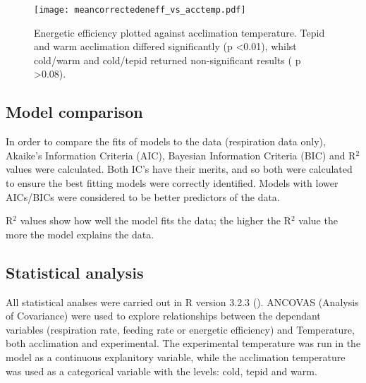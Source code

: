 \documentclass[../../Paper.tex]{subfiles}
\begin{document}
\begin{figure*}[!t]
\centering
\texttt{[image: meancorrectedeneff\_vs\_acctemp.pdf]}
\caption{Energetic efficiency plotted against acclimation temperature. Tepid and
warm acclimation differed significantly (p \textless 0.01), whilst cold/warm
and cold/tepid returned non-significant results
( p \textgreater 0.08).}
\end{figure*}

\subsection*{Model comparison}

In order to compare the fits of models to
the data (respiration data only), Akaike’s Information Criteria (AIC), Bayesian Information Criteria 
(BIC) and R$^2$ values were calculated. Both IC's have their 
merits, and so both were calculated to ensure the best fitting 
models were correctly identified. Models with lower AICs/BICs were considered 
to be better predictors of the data.

R$^2$ values show how well the model fits the data; the higher the R$^2$ value 
the more the model explains the data.



\subsection*{Statistical analysis}

All statistical analses were carried out in R version 3.2.3 (\cite{r_core_team_r:_2013}).
ANCOVAS (Analysis of Covariance) were used to explore relationships between the 
dependant variables (respiration rate, feeding rate or energetic efficiency) and Temperature, 
both acclimation and experimental. The experimental temperature was run in the
model as a continuous explanitory variable, while the acclimation temperature
was used as a categorical variable with the levels: cold, tepid and warm. 
\end{document}
